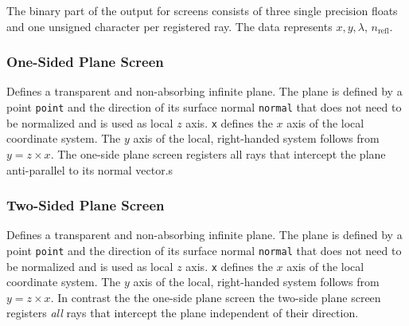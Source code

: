\documentclass[10pt,a4paper,titlepage]{article}
\begin{document}
The binary part of the output for screens consists of three single precision floats and one unsigned character per registered ray. The data represents $x, y, \lambda$, $n_{\mathrm{refl}}$.

\subsubsection{One-Sided Plane Screen}






\vspace{0.25cm}
Defines a transparent and non-absorbing infinite plane. The plane is defined by a point {\tt point} and the direction of its surface normal {\tt normal} that does not need to be normalized and is used as local $z$ axis. {\tt x} defines the $x$ axis of the local coordinate system. The $y$ axis of the local, right-handed system follows from $y=z \times x$. The one-side plane screen registers all rays that intercept the plane anti-parallel to its normal vector.s


\subsubsection{Two-Sided Plane Screen}






\vspace{0.25cm}
Defines a transparent and non-absorbing infinite plane. The plane is defined by a point {\tt point} and the direction of its surface normal {\tt normal} that does not need to be normalized and is used as local $z$ axis. {\tt x} defines the $x$ axis of the local coordinate system. The $y$ axis of the local, right-handed system follows from $y=z \times x$. In contrast the the one-side plane screen the two-side plane screen registers \emph{all} rays that intercept the plane independent of their direction.
\end{document}

